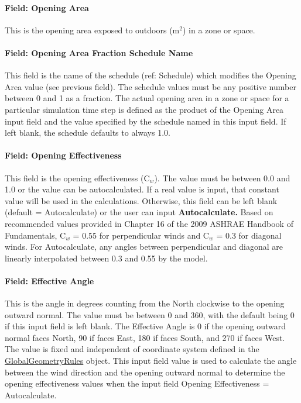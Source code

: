 \paragraph{Field: Opening Area}\label{field-opening-area}

This is the opening area exposed to outdoors (m\(^{2}\)) in a zone or space.

\paragraph{Field: Opening Area Fraction Schedule Name}\label{field-opening-area-fraction-schedule-name}

This field is the name of the schedule (ref: Schedule) which modifies the Opening Area value (see previous field). The schedule values must be any positive number between 0 and 1 as a fraction. The actual opening area in a zone or space for a particular simulation time step is defined as the product of the Opening Area input field and the value specified by the schedule named in this input field. If left blank, the schedule defaults to always 1.0.

\paragraph{Field: Opening Effectiveness}\label{field-opening-effectiveness}

This field is the opening effectiveness (C\(_{w}\)). The value must be between 0.0 and 1.0 or the value can be autocalculated. If a real value is input, that constant value will be used in the calculations. Otherwise, this field can be left blank (default = Autocalculate) or the user can input \textbf{Autocalculate.} Based on recommended values provided in Chapter 16 of the 2009 ASHRAE Handbook of Fundamentals, C\(_{w}\) = 0.55 for perpendicular winds and C\(_{w}\) = 0.3 for diagonal winds. For Autocalculate, any angles between perpendicular and diagonal are linearly interpolated between 0.3 and 0.55 by the model.

\paragraph{Field: Effective Angle}\label{field-effective-angle}

This is the angle in degrees counting from the North clockwise to the opening outward normal. The value must be between 0 and 360, with the default being 0 if this input field is left blank. The Effective Angle is 0 if the opening outward normal faces North, 90 if faces East, 180 if faces South, and 270 if faces West. The value is fixed and independent of coordinate system defined in the \hyperref[globalgeometryrules]{GlobalGeometryRules} object. This input field value is used to calculate the angle between the wind direction and the opening outward normal to determine the opening effectiveness values when the input field Opening Effectiveness = Autocalculate.

